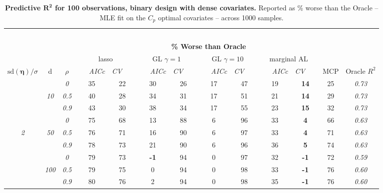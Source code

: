 

\clearpage
\begin{table}
\vspace{-.2cm}
\footnotesize
\caption{ 
	{\bf  Predictive $\boldsymbol{R^2}$ for 100 observations, 
	binary design with dense covariates.}
  Reported as  \% worse than the Oracle 
  -- MLE fit on the $C_p$ optimal covariates -- 
  across 1000 samples.}
\begin{center}
\begin{tabular}{ccc|cc|cc|cc|cc|c|c}
\hline &&&\multicolumn{9}{|c|}{~}\\[-1ex]
\multicolumn{3}{c}{~}&\multicolumn{9}{|c|}{\bf \% Worse than Oracle } &   \\[1ex]
& &
& \multicolumn{2}{c}{lasso} 
& \multicolumn{2}{c}{GL $\gamma=1$} 
& \multicolumn{2}{c}{GL $\gamma=10$} 
& \multicolumn{2}{c}{marginal AL} 
& \multicolumn{1}{c|}{~} & \\[-0.5ex]
$\mathrm{sd}(\boldsymbol{\eta})/\sigma$ & {\sf d} & $\rho$ 
& ~~~\scriptsize\it AICc & \multicolumn{1}{c}{\scriptsize\it CV~~~}
& ~~~\scriptsize\it AICc & \multicolumn{1}{c}{\scriptsize\it CV~~~}
& ~~~\scriptsize\it AICc & \multicolumn{1}{c}{\scriptsize\it CV~~~}
& ~~~\scriptsize\it AICc & \multicolumn{1}{c}{\scriptsize\it CV~~~} 
& \multicolumn{1}{c|}{ MCP} & Oracle $R^2$ \\[.5ex]
\hline\rule{0pt}{3ex}
& & \it  0  & 35 & 22 & 30 & 26 & 17 & 47 & 19 & {\bf 14} & 25 & \it  0.73 \\
 & \it  10  & \it  0.5  & 40 & 28 & 34 & 31 & 17 & 51 & 21 & {\bf 14} & 29 & \it  0.73 \\
& & \it  0.9  & 43 & 30 & 38 & 34 & 17 & 55 & 23 & {\bf 15} & 32 & \it  0.73 \\[1ex]
\cline{2-3}\rule{0pt}{3ex}
& & \it  0  & 75 & 68 & 13 & 88 & 6 & 96 & 33 & {\bf 4} & 66 & \it  0.63 \\
\it  2  & \it  50  & \it  0.5  & 76 & 71 & 16 & 90 & 6 & 97 & 33 & {\bf 4} & 71 & \it  0.63 \\
& & \it  0.9  & 78 & 73 & 21 & 90 & 6 & 96 & 36 & {\bf 5} & 74 & \it  0.63 \\[1ex]
\cline{2-3}\rule{0pt}{3ex}
& & \it  0  & 79 & 73 & {\bf -1} & 94 & 0 & 97 & 32 & {\bf -1} & 72 & \it  0.59 \\
 & \it  100  & \it  0.5  & 79 & 75 & 0 & 94 & 0 & 98 & 33 & {\bf -1} & 76 & \it  0.60 \\
& & \it  0.9  & 80 & 76 & 2 & 94 & 0 & 98 & 35 & {\bf -1} & 76 & \it  0.60 \\[1ex]

\end{tabular}
\end{center}
\end{table}
